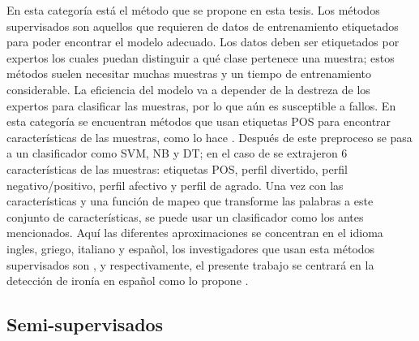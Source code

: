 \par En esta categoría está el método que se propone en esta tesis. Los métodos supervisados son aquellos que requieren de datos de entrenamiento etiquetados para poder encontrar el modelo adecuado. Los datos deben ser etiquetados por expertos los cuales puedan distinguir a qué clase pertenece una muestra; estos métodos suelen necesitar muchas muestras y un tiempo de entrenamiento considerable. La eficiencia del modelo va a depender de la destreza de los expertos para clasificar las muestras, por lo que aún es susceptible a fallos. En esta categoría se encuentran métodos que usan etiquetas \gls{POS} para encontrar características de las muestras, como lo hace \textcite{reyes2012making}. Después de este preproceso se pasa a un clasificador como \gls{SVM}, \gls{NB} y \gls{DT}; en el caso de \textcite{reyes2012making} se extrajeron 6 características de las muestras:  etiquetas \gls{POS}, perfil divertido, perfil negativo/positivo, perfil afectivo y perfil de agrado. Una vez con las características y una función de mapeo que transforme las palabras a este conjunto de características, se puede usar un clasificador como los antes mencionados.
Aquí las diferentes aproximaciones se concentran en el idioma ingles, griego, italiano y español, los investigadores que usan esta métodos supervisados son \textcite{charalampakis2015detecting}, \textcite{barbieri2014italian} y \textcite{lopez2016character} respectivamente, el presente trabajo se centrará en la detección de ironía en español como lo propone \textcite{lopez2016character}.

\subsection{Semi-supervisados}

